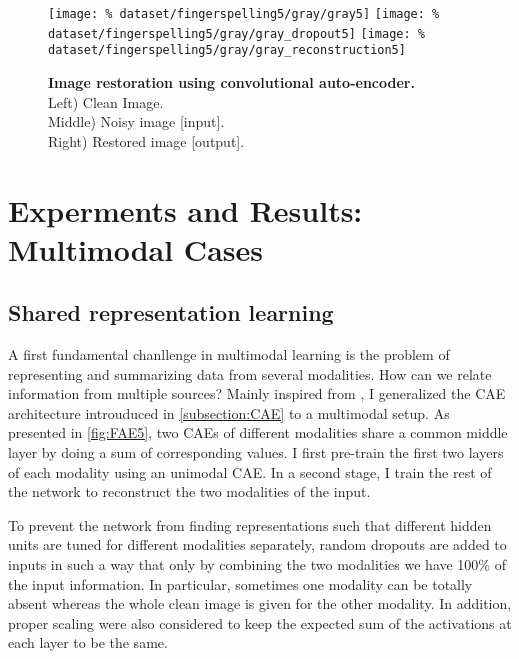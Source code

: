 \begin{figure}[H]
  \centering
  \hfill
  \texttt{[image: \%
    dataset/fingerspelling5/gray/gray5]}
  \hfill
  \texttt{[image: \%
    dataset/fingerspelling5/gray/gray\_dropout5]}
  \hfill
  \texttt{[image: \%
    dataset/fingerspelling5/gray/gray\_reconstruction5]}
  \caption{%
    \textbf{Image restoration using convolutional auto-encoder.}\\[0.1em]
      Left) Clean Image.\\[0.1em]
      Middle) Noisy image [input].\\[0.1em]
      Right) Restored image [output].}
  \label{fig:image_restoration}
\end{figure}

\section{Experments and Results: Multimodal Cases} \label{section:multi}

\subsection{Shared representation learning} \label{subsection:shared}

A first fundamental chanllenge in multimodal learning is the problem
of representing and summarizing data from several modalities.
How can we relate information from multiple sources?
Mainly inspired from \cite{J. Ngiam 2011, A. Droniou 2014},
I generalized the CAE architecture introuduced in \ref{subsection:CAE}
to a multimodal setup. As presented in \autoref{fig:FAE5}, two CAEs
of different modalities share a common middle layer by doing a sum
of corresponding values. I first pre-train the first two layers
of each modality using an unimodal CAE. In a second stage, I train the
rest of the network to reconstruct the two modalities of the input.

To prevent the network from finding representations such that different
hidden units are tuned for different modalities separately, random
dropouts are added to inputs in such a way that only by combining the
two modalities we have 100\% of the input information. In particular,
sometimes one modality can be totally absent whereas the whole clean
image is given for the other modality. In addition, proper scaling were
also considered to keep the expected sum of the activations at each layer
to be the same.

